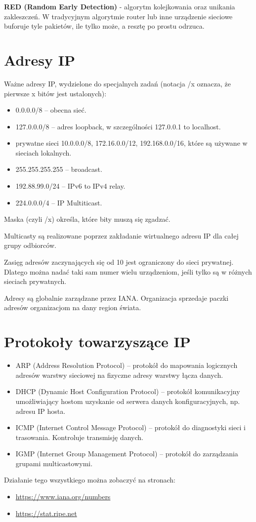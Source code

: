 \textbf{RED (Random Early Detection)} - algorytm kolejkowania oraz unikania zakleszczeń. W tradycyjnym algorytmie router lub inne urządzenie sieciowe buforuje tyle pakietów, ile tylko może, a resztę po prostu odrzuca.

\section{Adresy IP}
Ważne adresy IP, wydzielone do specjalnych zadań (notacja /x oznacza, że pierwsze x bitów jest ustalonych):
\begin{itemize}
	\item 0.0.0.0/8 -- obecna sieć.
	\item 127.0.0.0/8 -- adres loopback, w szczególności 127.0.0.1 to localhost.
	\item  prywatne sieci 10.0.0.0/8, 172.16.0.0/12, 192.168.0.0/16, które są używane w sieciach lokalnych.
	\item 255.255.255.255 -- broadcast.
	\item 192.88.99.0/24 -- IPv6 to IPv4 relay.
	\item 224.0.0.0/4 -- IP Multiticast.
\end{itemize}

Maska (czyli /x) określa, które bity muszą się zgadzać.

Multicasty są realizowane poprzez zakładanie wirtualnego adresu IP dla całej grupy odbiorców.

Zasięg adresów zaczynających się od 10 jest ograniczony do sieci prywatnej. Dlatego można nadać taki sam numer wielu urządzeniom, jeśli tylko są w różnych sieciach prywatnych.

Adresy są globalnie zarządzane przez IANA. Organizacja sprzedaje paczki adresów organizacjom na dany region świata.

\section{Protokoły towarzyszące IP}
\begin{itemize}
	\item ARP (Address Resolution Protocol) -- protokół do mapowania logicznych adresów warstwy sieciowej na fizyczne adresy warstwy łącza danych.
	\item DHCP (Dynamic Host Configuration Protocol) -- protokół komunikacyjny umożliwiający hostom uzyskanie od serwera danych konfiguracyjnych, np. adresu IP hosta.
	\item ICMP (Internet Control Message Protocol) -- protokół do diagnostyki sieci i trasowania. Kontroluje transmisję danych.
	\item IGMP (Internet Group Management Protocol) -- protokół do zarządzania grupami multicastowymi.
\end{itemize}

Działanie tego wszystkiego można zobaczyć na stronach:
\begin{itemize}
	\item \href{https://www.iana.org/numbers}{https://www.iana.org/numbers}
	\item \href{https://stat.ripe.net}{https://stat.ripe.net}
\end{itemize}
